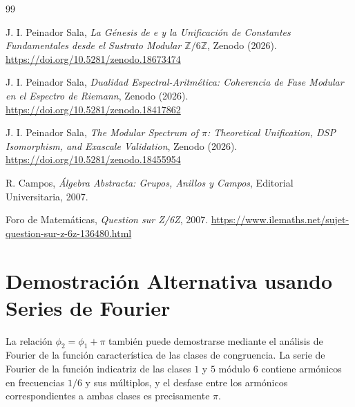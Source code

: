 \documentclass[12pt,a4paper]{article}
\theoremstyle{plain}
\theoremstyle{definition}
\theoremstyle{remark}
\begin{document}
\begin{thebibliography}{99}

J. I. Peinador Sala, \textit{La Génesis de e y la Unificación de Constantes Fundamentales desde el Sustrato Modular $\mathbb{Z}/6\mathbb{Z}$}, Zenodo (2026). \url{https://doi.org/10.5281/zenodo.18673474}

J. I. Peinador Sala, \textit{Dualidad Espectral-Aritmética: Coherencia de Fase Modular en el Espectro de Riemann}, Zenodo (2026). \url{https://doi.org/10.5281/zenodo.18417862}

J. I. Peinador Sala, \textit{The Modular Spectrum of $\pi$: Theoretical Unification, DSP Isomorphism, and Exascale Validation}, Zenodo (2026). \url{https://doi.org/10.5281/zenodo.18455954}

R. Campos, \textit{Álgebra Abstracta: Grupos, Anillos y Campos}, Editorial Universitaria, 2007.

Foro de Matemáticas, \textit{Question sur Z/6Z}, 2007. \url{https://www.ilemaths.net/sujet-question-sur-z-6z-136480.html}

\end{thebibliography}

\appendix

\section{Demostración Alternativa usando Series de Fourier}

La relación $\phi_2 = \phi_1 + \pi$ también puede demostrarse mediante el análisis de Fourier de la función característica de las clases de congruencia. La serie de Fourier de la función indicatriz de las clases $1$ y $5$ módulo $6$ contiene armónicos en frecuencias $1/6$ y sus múltiplos, y el desfase entre los armónicos correspondientes a ambas clases es precisamente $\pi$.
\end{document}
